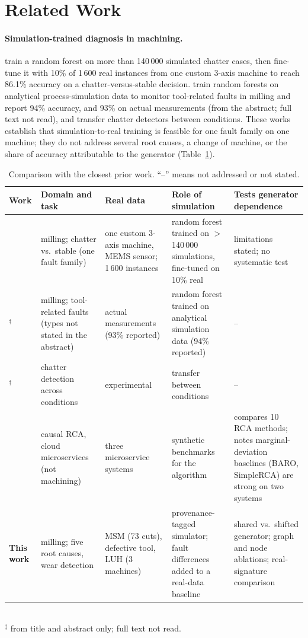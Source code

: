 \documentclass[11pt]{article}
\begin{document}
\section{Related Work}
\paragraph{Simulation-trained diagnosis in machining.}
\citet{alberts2024sim2real} train a random forest on more than 140\,000 simulated chatter cases, then fine-tune it with 10\% of 1\,600 real instances from one custom 3-axis machine to reach 86.1\% accuracy on a chatter-versus-stable decision.
\citet{ebrahimi2023smartfaults} train random forests on analytical process-simulation data to monitor tool-related faults in milling and report 94\% accuracy, and 93\% on actual measurements (from the abstract; full text not read), and \citet{yesilli2022tlchatter} transfer chatter detectors between conditions.
These works establish that simulation-to-real training is feasible for one fault family on one machine; they do not address several root causes, a change of machine, or the share of accuracy attributable to the generator (Table~\ref{tab:related}).

\begin{table}[t]\centering\footnotesize
\caption{Comparison with the closest prior work. ``--'' means not addressed or not stated.}\label{tab:related}
\begin{tabular}{p{2.1cm}p{2.5cm}p{2.5cm}p{2.9cm}p{2.9cm}}\toprule
Work & Domain and task & Real data & Role of simulation & Tests generator dependence\\\midrule
\citet{alberts2024sim2real} & milling; chatter vs.\ stable (one fault family) & one custom 3-axis machine, MEMS sensor; 1\,600 instances & random forest trained on $>$140\,000 simulations, fine-tuned on 10\% real & limitations stated; no systematic test\\
\citet{ebrahimi2023smartfaults}$^{\ddagger}$ & milling; tool-related faults (types not stated in the abstract) & actual measurements (93\% reported) & random forest trained on analytical simulation data (94\% reported) & --\\
\citet{yesilli2022tlchatter}$^{\ddagger}$ & chatter detection across conditions & experimental & transfer between conditions & --\\
\citet{lee2026brcd} & causal RCA, cloud microservices (not machining) & three microservice systems & synthetic benchmarks for the algorithm & compares 10 RCA methods; notes marginal-deviation baselines (BARO, SimpleRCA) are strong on two systems\\
\textbf{This work} & milling; five root causes, wear detection & MSM (73 cuts), defective tool, LUH (3 machines) & provenance-tagged simulator; fault differences added to a real-data baseline & shared vs.\ shifted generator; graph and node ablations; real-signature comparison\\\bottomrule
\end{tabular}\\[2pt]
{\footnotesize $^{\ddagger}$ from title and abstract only; full text not read.}
\end{table}
\end{document}
